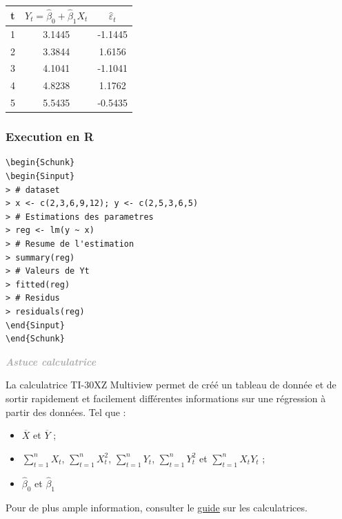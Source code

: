 \documentclass[11pt,french]{report}
\newenvironment{moreInfo}[1]
	{\begin{mdframed}
	\textcolor{darkgray}{\huge \raisebox{-3.5pt}{\faInfo} 
	\hspace{0.5cm} \large\bfseries #1}\\[5pt]
	\normalsize
	\makebox[0.1\textwidth][l]{}	
	\begin{minipage}{10cm}}
	{	\end{minipage}
	\end{mdframed}}
\begin{document}
\begin{center}
\begin{tabular}{|c|c|c|}
\hline
t & $Y_t = \hat{\beta}_0 + \hat{\beta}_1X_t$ & $\hat{\varepsilon}_t$ \\
\hline
1 & 3.1445 & -1.1445 \\
2 & 3.3844 & 1.6156 \\
3 & 4.1041 & -1.1041 \\
4 & 4.8238 & 1.1762 \\
5 & 5.5435 & -0.5435 \\
\hline
\end{tabular}
\end{center}

\begin{center}
\end{center}

\bigskip
\subsubsection*{Execution en R}
\begin{lstlisting}[linerange=\\begin\{Sinput\}-\\end\{Sinput\},includerangemarker=false, caption = Code source en R pour l'exemple]
\begin{Schunk}
\begin{Sinput}
> # dataset
> x <- c(2,3,6,9,12); y <- c(2,5,3,6,5)
> # Estimations des parametres
> reg <- lm(y ~ x)
> # Resume de l'estimation
> summary(reg)
> # Valeurs de Yt
> fitted(reg)
> # Residus 
> residuals(reg)
\end{Sinput}
\end{Schunk}
\end{lstlisting}

\bigskip
\begin{moreInfo}{\emph{Astuce calculatrice}}
	La calculatrice TI-30XZ Multiview permet de créé un tableau de donnée et de sortir rapidement et facilement différentes informations sur une régression à partir des données. Tel que :
	\begin{itemize}
	\item $\overline{X}$ et $\overline{Y}$ ;
	\item $\sum_{t=1}^n X_t$, $\sum_{t=1}^n X_t^2$, $\sum_{t=1}^n Y_t$, $\sum_{t=1}^n Y_t^2$ et $\sum_{t=1}^n X_tY_t$ ;
	\item $\hat{\beta}_0$ et $\hat{\beta}_1$
	\end{itemize}
	Pour de plus ample information, consulter le \href{https://github.com/alpa12/guide_calculatrice}{guide} sur les calculatrices.
\end{moreInfo}
\bigskip
\end{document}
